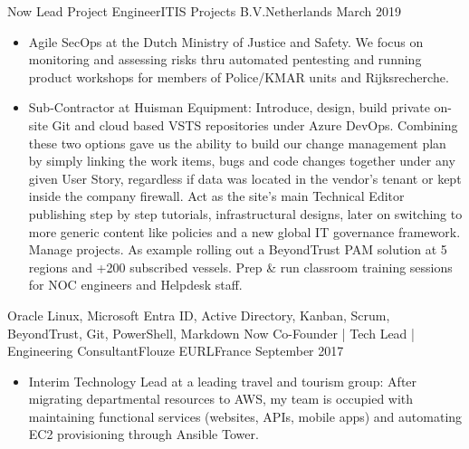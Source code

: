 %
%
%

\begin{experiences}
  \experience
    {Now}           {Lead Project Engineer}{ITIS Projects B.V.}{Netherlands}
    {March 2019}    {
                      \begin{itemize}                        
                        \item Agile SecOps at the Dutch Ministry of Justice and Safety. We focus on monitoring and assessing risks thru automated pentesting and running product workshops for members of Police/KMAR units and Rijksrecherche.  

                        \item Sub-Contractor at  Huisman Equipment:
                        \newline Introduce, design, build private on-site Git and cloud based VSTS repositories under Azure DevOps. Combining these two options gave us the ability to build our change management plan by simply linking  the work items, bugs and code changes together under any given User Story, regardless if data was located in the vendor's tenant or kept inside the company firewall.
                        \linebreak Act as the site's main Technical Editor publishing step by step tutorials, infrastructural designs, later on switching to more generic content like policies and a new global IT governance framework.
                        \linebreak Manage projects. As example rolling out a BeyondTrust PAM solution at 5 regions and +200 subscribed vessels.
                        \linebreak Prep \& run classroom training sessions for NOC engineers and Helpdesk staff.      
                      \end{itemize}
                    }
                    {Oracle Linux, Microsoft Entra ID, Active Directory, Kanban, Scrum, BeyondTrust, Git, PowerShell, Markdown}
  \emptySeparator
  \experience
    {Now}           {Co-Founder | Tech Lead | Engineering Consultant}{Flouze EURL}{France}
    {September 2017}{
                      \begin{itemize}
                        \item Interim Technology Lead at a leading travel and tourism group: 
                        \newline After migrating departmental resources to AWS, my team is occupied with maintaining functional services (websites, APIs, mobile apps) and automating EC2 provisioning through Ansible Tower.                           


\end{itemize}}
\end{experiences}
